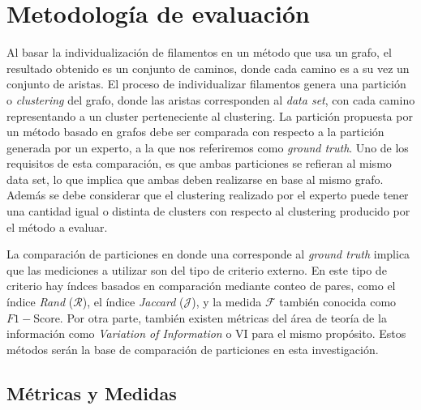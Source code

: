 \chapter{Metodolog\'ia de evaluaci\'on}
\label{chap:metodologia}

Al basar la individualizaci\'on de filamentos en un m\'etodo que usa un grafo, el resultado obtenido es un conjunto de caminos, donde cada camino es a su vez un conjunto de aristas. El proceso de individualizar filamentos genera una partici\'on o {\it clustering} del grafo, donde las aristas corresponden al {\it data set}, con cada camino representando a un cluster perteneciente al clustering. La partici\'on propuesta por un m\'etodo basado en grafos debe ser comparada con respecto a la partici\'on generada por un experto, a la que nos referiremos como {\it ground truth}. Uno de los requisitos de esta comparaci\'on, es que ambas particiones se refieran al mismo data set, lo que implica que ambas deben realizarse en base al mismo grafo. Adem\'as se debe considerar que el clustering realizado por el experto puede tener una cantidad igual o distinta de clusters con respecto al clustering producido por el m\'etodo a evaluar.


La comparaci\'on de particiones en donde una corresponde al {\it ground truth} implica que las mediciones a utilizar son del tipo de criterio externo\cite{manning20introduction}. En este tipo de criterio hay \'indces basados en comparaci\'on mediante conteo de pares, como el \'indice {\it Rand} ($\mathcal{R}$), el \'indice {\it Jaccard} ($\mathcal{J}$), y la medida $\mathcal{F}$ tambi\'en conocida como $F1-$Score. Por otra parte, tambi\'en existen m\'etricas del \'area de teor\'ia de la informaci\'on como {\it Variation of Information} o VI para el mismo prop\'osito. Estos m\'etodos ser\'an la base de comparaci\'on de particiones en esta investigaci\'on.

\section{M\'etricas y Medidas}
\label{sec:metricasymedidas}

